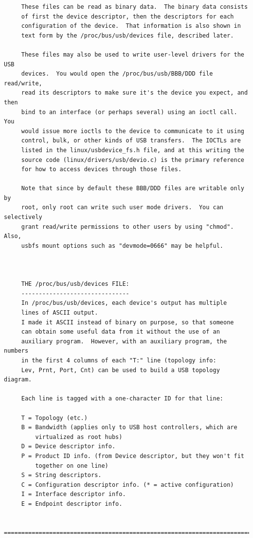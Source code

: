 {{{{{{{{{{{{{{{{{\begin{verbatim}
     These files can be read as binary data.  The binary data consists
     of first the device descriptor, then the descriptors for each
     configuration of the device.  That information is also shown in
     text form by the /proc/bus/usb/devices file, described later.
     
     These files may also be used to write user-level drivers for the USB
     devices.  You would open the /proc/bus/usb/BBB/DDD file read/write,
     read its descriptors to make sure it's the device you expect, and then
     bind to an interface (or perhaps several) using an ioctl call.  You
     would issue more ioctls to the device to communicate to it using
     control, bulk, or other kinds of USB transfers.  The IOCTLs are
     listed in the linux/usbdevice_fs.h file, and at this writing the
     source code (linux/drivers/usb/devio.c) is the primary reference
     for how to access devices through those files.
     
     Note that since by default these BBB/DDD files are writable only by
     root, only root can write such user mode drivers.  You can selectively
     grant read/write permissions to other users by using "chmod".  Also,
     usbfs mount options such as "devmode=0666" may be helpful.
     
     
     
     THE /proc/bus/usb/devices FILE:
     -------------------------------
     In /proc/bus/usb/devices, each device's output has multiple
     lines of ASCII output.
     I made it ASCII instead of binary on purpose, so that someone
     can obtain some useful data from it without the use of an
     auxiliary program.  However, with an auxiliary program, the numbers
     in the first 4 columns of each "T:" line (topology info:
     Lev, Prnt, Port, Cnt) can be used to build a USB topology diagram.
     
     Each line is tagged with a one-character ID for that line:
     
     T = Topology (etc.)
     B = Bandwidth (applies only to USB host controllers, which are
         virtualized as root hubs)
     D = Device descriptor info.
     P = Product ID info. (from Device descriptor, but they won't fit
         together on one line)
     S = String descriptors.
     C = Configuration descriptor info. (* = active configuration)
     I = Interface descriptor info.
     E = Endpoint descriptor info.
     
     =======================================================================
     

\end{verbatim}}}}}}}}}}}}}}}}}}
